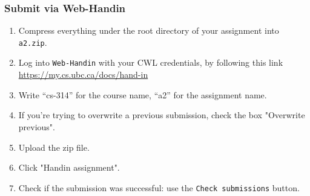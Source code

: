 \documentclass[12pt]{exam}
\begin{document}
\subsubsection{Submit via Web-Handin}
\begin{enumerate}[1.]
  \item Compress everything under the root directory of your assignment into {\tt a2.zip}.
  \item Log into {\tt Web-Handin} with your CWL credentials, by following this link \url{https://my.cs.ubc.ca/docs/hand-in}
  \item Write ``cs-314'' for the course name, ``a2'' for the assignment name.
  \item If you're trying to overwrite a previous submission, check the box "Overwrite previous".
  \item Upload the zip file.
  \item Click "Handin assignment".
  \item Check if the submission was successful: use the {\tt Check submissions} button.
\end{enumerate}
\end{document}

